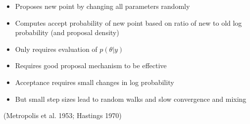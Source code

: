 \documentclass[10pt]{report}
\newcommand{\sld}[1]{\newpage{\noindent\LARGE \ \ \
    \textcolor{MidnightBlue}{\bfseries #1}}\vspace*{4pt}}
\begin{document}
\sld{Metropolis-Hastings Sampling}
\begin{itemize}
\item Proposes new point by changing all parameters randomly
\item Computes accept probability of new point based
  on ratio of new to old log probability (and proposal density)
\item Only requires evaluation of $p(\theta|y)$
\item Requires good proposal mechanism to be effective
\item Acceptance requires small changes in log probability
\item But small step sizes lead to random walks and slow convergence
  and mixing
\end{itemize}
\vfill\hfill
{\small (Metropolis et al. 1953; Hastings 1970)}
\end{document}
